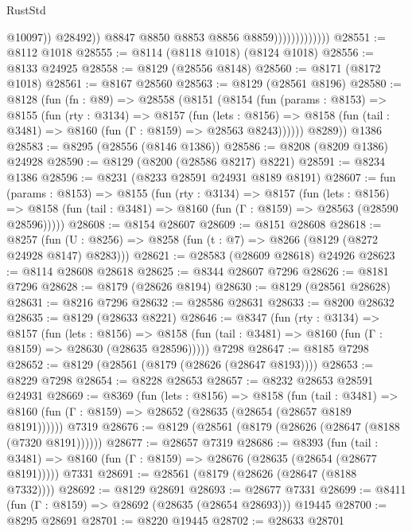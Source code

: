 \begin{lexlean}{RustStd}
\begin{coremodule}
                                      @10097))
                                  @28492))
                              @8847
                              @8850
                              @8853
                              @8856
                              @8859)))))))))))))
@28551 := @8112 @1018
@28555 := @8114 (@8118 @1018) (@8124 @1018)
@28556 := @8133 @24925
@28558 := @8129 (@28556 @8148)
@28560 := @8171 (@8172 @1018)
@28561 := @8167 @28560
@28563 := @8129 (@28561 @8196)
@28580 := @8128
    (fun (fn : @89) =>
    @28558
      (@8151
        (@8154
          (fun (params : @8153) =>
          @8155
            (fun (rty : @3134) =>
            @8157
              (fun (lets : @8156) =>
              @8158 (fun (tail : @3481) => @8160 (fun (Γ : @8159) => @28563 @8243))))))
        @8289))
    @1386
@28583 := @8295 (@28556 (@8146 @1386))
@28586 := @8208 (@8209 @1386) @24928
@28590 := @8129 (@8200 (@28586 @8217) @8221)
@28591 := @8234 @1386
@28596 := @8231 (@8233 @28591 @24931 @8189 @8191)
@28607 := fun (params : @8153) =>
  @8155
    (fun (rty : @3134) =>
    @8157
      (fun (lets : @8156) =>
      @8158 (fun (tail : @3481) => @8160 (fun (Γ : @8159) => @28563 (@28590 @28596)))))
@28608 := @8154 @28607
@28609 := @8151 @28608
@28618 := @8257
    (fun (U : @8256) => @8258 (fun (t : @7) => @8266 (@8129 (@8272 @24928 @8147) @8283)))
@28621 := @28583 (@28609 @28618) @24926
@28623 := @8114 @28608 @28618
@28625 := @8344 @28607 @7296
@28626 := @8181 @7296
@28628 := @8179 (@28626 @8194)
@28630 := @8129 (@28561 @28628)
@28631 := @8216 @7296
@28632 := @28586 @28631
@28633 := @8200 @28632
@28635 := @8129 (@28633 @8221)
@28646 := @8347
    (fun (rty : @3134) =>
    @8157
      (fun (lets : @8156) =>
      @8158 (fun (tail : @3481) => @8160 (fun (Γ : @8159) => @28630 (@28635 @28596)))))
    @7298
@28647 := @8185 @7298
@28652 := @8129 (@28561 (@8179 (@28626 (@28647 @8193))))
@28653 := @8229 @7298
@28654 := @8228 @28653
@28657 := @8232 @28653 @28591 @24931
@28669 := @8369
    (fun (lets : @8156) =>
    @8158
      (fun (tail : @3481) =>
      @8160 (fun (Γ : @8159) => @28652 (@28635 (@28654 (@28657 @8189 @8191))))))
    @7319
@28676 := @8129 (@28561 (@8179 (@28626 (@28647 (@8188 (@7320 @8191))))))
@28677 := @28657 @7319
@28686 := @8393
    (fun (tail : @3481) => @8160 (fun (Γ : @8159) => @28676 (@28635 (@28654 (@28677 @8191)))))
    @7331
@28691 := @28561 (@8179 (@28626 (@28647 (@8188 @7332))))
@28692 := @8129 @28691
@28693 := @28677 @7331
@28699 := @8411 (fun (Γ : @8159) => @28692 (@28635 (@28654 @28693))) @19445
@28700 := @8295 @28691
@28701 := @8220 @19445
@28702 := @28633 @28701

\end{coremodule}
\end{lexlean}
